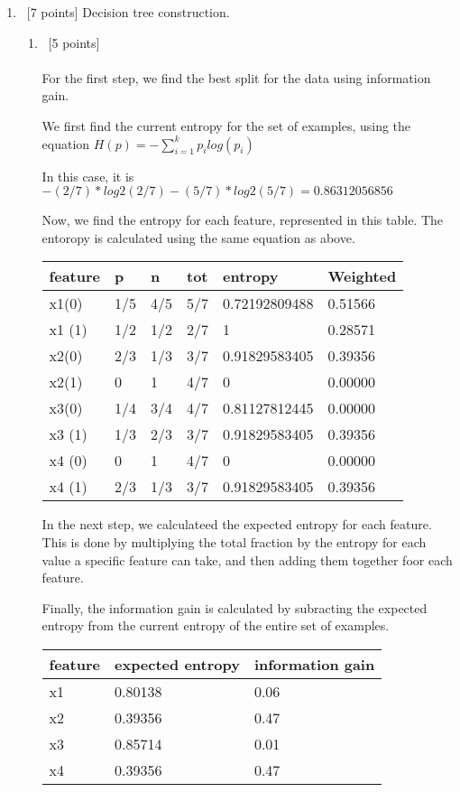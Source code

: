\documentclass[12pt, fullpage,letterpaper]{article}
\begin{document}
\begin{enumerate}
\item~[7 points] Decision tree construction. 
\begin{enumerate}
\item~[5 points] \\\\
For the first step, we find the best split for the data using information gain. 

We first find the current entropy for the set of examples, using the equation $H(p)=-\sum^k_{i=1}p_ilog(p_i)$

In this case, it is $-(2/7)*log2(2/7)-(5/7)*log2(5/7)=0.86312056856$

Now, we find the entropy for each feature, represented in this table. The entoropy is calculated using the same equation as above.

\begin{tabular}{|l|l|l|l|l|l|}
	\hline
	feature & p   & n   & tot & entropy       & Weighted \\ \hline
	x1(0)   & 1/5 & 4/5 & 5/7 & 0.72192809488 & 0.51566  \\ \hline
	x1 (1)  & 1/2 & 1/2 & 2/7 & 1             & 0.28571  \\ \hline
	x2(0)   & 2/3 & 1/3 & 3/7 & 0.91829583405 & 0.39356  \\ \hline
	x2(1)   & 0   & 1   & 4/7 & 0             & 0.00000  \\ \hline
	x3(0)   & 1/4 & 3/4 & 4/7 & 0.81127812445 & 0.00000  \\ \hline
	x3 (1)  & 1/3 & 2/3 & 3/7 & 0.91829583405 & 0.39356  \\ \hline
	x4 (0)  & 0   & 1   & 4/7 & 0             & 0.00000  \\ \hline
	x4 (1)  & 2/3 & 1/3 & 3/7 & 0.91829583405 & 0.39356  \\ \hline
	\end{tabular}

In the next step, we calculateed the expected entropy for each feature. This is done by multiplying the total fraction by the entropy for each value a specific feature can take, and then adding  them together foor each feature.

Finally, the information gain is calculated by subracting the expected entropy from the current entropy of the entire set of examples.


	\begin{tabular}{|l|l|l|}
	\hline
	feature & expected entropy & information gain \\ \hline
	x1      & 0.80138          & 0.06             \\ \hline
	x2      & 0.39356          & 0.47             \\ \hline
	x3      & 0.85714          & 0.01             \\ \hline
	x4      & 0.39356          & 0.47             \\ \hline
	\end{tabular}


\end{enumerate}
\end{enumerate}
\end{document}
